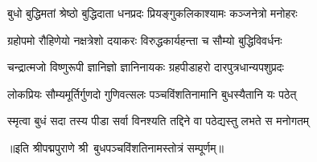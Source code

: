 

\twolineshloka
{बुधो बुद्धिमतां श्रेष्ठो बुद्धिदाता धनप्रदः}
{प्रियङ्गुकलिकाश्यामः कञ्जनेत्रो मनोहरः}

\twolineshloka
{ग्रहोपमो रौहिणेयो नक्षत्रेशो दयाकरः}
{विरुद्धकार्यहन्ता च सौम्यो बुद्धिविवर्धनः}

\twolineshloka
{चन्द्रात्मजो विष्णुरूपी ज्ञानिज्ञो ज्ञानिनायकः}
{ग्रहपीडाहरो दारपुत्रधान्यपशुप्रदः}

\twolineshloka
{लोकप्रियः सौम्यमूर्तिर्गुणदो गुणिवत्सलः}
{पञ्चविंशतिनामानि बुधस्यैतानि यः पठेत्}

\twolineshloka
{स्मृत्वा बुधं सदा तस्य पीडा सर्वा विनश्यति}
{तद्दिने वा पठेद्यस्तु लभते स मनोगतम्}

॥इति श्रीपद्मपुराणे श्री~बुधपञ्चविंशतिनामस्तोत्रं सम्पूर्णम्॥
